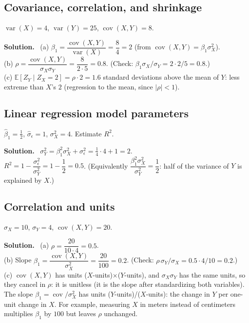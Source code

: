 \documentclass[11pt]{article}
\newcommand{\E}{\mathbb{E}}
\newcommand{\Var}{\operatorname{var}}
\newcommand{\Cov}{\operatorname{cov}}
\newenvironment{soln}{\par\smallskip\noindent\textbf{Solution.}\ }{\par\medskip}
\begin{document}
\subsection*{Covariance, correlation, and shrinkage}
$\Var(X)=4$, $\Var(Y)=25$, $\Cov(X,Y)=8$.
\begin{soln}
(a) $\beta_1=\dfrac{\Cov(X,Y)}{\Var(X)}=\dfrac84=2$ (from $\Cov(X,Y)=\beta_1\sigma_X^2$).\\
(b) $\rho=\dfrac{\Cov(X,Y)}{\sigma_X\sigma_Y}=\dfrac8{2\cdot5}=0.8$. (Check: $\beta_1\sigma_X/\sigma_Y=2\cdot2/5=0.8$.)\\
(c) $\E[Z_Y\mid Z_X{=}2]=\rho\cdot2=1.6$ standard deviations above the mean of $Y$: less extreme than $X$'s $2$ (regression to the mean, since $|\rho|<1$).
\end{soln}

\subsection*{Linear regression model parameters}
$\hat\beta_1=\frac12$, $\hat\sigma_\epsilon=1$, $\sigma_X^2=4$. Estimate $R^2$.
\begin{soln}
$\sigma_Y^2=\beta_1^2\sigma_X^2+\sigma_\epsilon^2=\frac14\cdot4+1=2$.\\
$R^2=1-\dfrac{\sigma_\epsilon^2}{\sigma_Y^2}=1-\dfrac12=0.5$. (Equivalently $\dfrac{\beta_1^2\sigma_X^2}{\sigma_Y^2}=\dfrac12$: half of the variance of $Y$ is explained by $X$.)
\end{soln}

\subsection*{Correlation and units}
$\sigma_X=10$, $\sigma_Y=4$, $\Cov(X,Y)=20$.
\begin{soln}
(a) $\rho=\dfrac{20}{10\cdot4}=0.5$.\\
(b) Slope $\beta_1=\dfrac{\Cov(X,Y)}{\sigma_X^2}=\dfrac{20}{100}=0.2$. (Check: $\rho\,\sigma_Y/\sigma_X=0.5\cdot4/10=0.2$.)\\
(c) $\Cov(X,Y)$ has units ($X$-units)$\times$($Y$-units), and $\sigma_X\sigma_Y$ has the same units, so they cancel in $\rho$: it is unitless (it is the slope after standardizing both variables). The slope $\beta_1=\Cov/\sigma_X^2$ has units ($Y$-units)/($X$-units): the change in $Y$ per one-unit change in $X$. For example, measuring $X$ in meters instead of centimeters multiplies $\beta_1$ by $100$ but leaves $\rho$ unchanged.
\end{soln}
\end{document}
